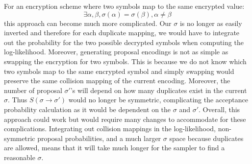 \documentclass[12pt]{article}
\begin{document}
\begin{enumerate}
For an encryption scheme where two symbols map to the same encrypted value:
$$\exists \alpha, \beta, \sigma(\alpha) = \sigma(\beta), \alpha \neq \beta$$
this approach can become much more complicated. Our $\sigma$ is no longer as easily inverted and therefore for each duplicate mapping, we would have to integrate out the probability for the two possible decrypted symbols when computing the log-likelihood. Moreover, generating proposal encodings is not as simple as swapping the encryption for two symbols. This is because we do not know which two symbols map to the same encrypted symbol and simply swapping would preserve the same collision mapping of the current encoding. Moreover, the number of proposal $\sigma'$'s will depend on how many duplicates exist in the current $\sigma$. Thus $S(\sigma \rightarrow \sigma')$ would no longer be symmetric, complicating the acceptance probability calculation as it would be dependent on the $\sigma$ and $\sigma'$. Overall, this approach could work but would require many changes to accommodate for these complications. Integrating out collision mappings in the log-likelihood, non-symmetric proposal probabilities, and a much larger $\sigma$ space because duplicates are allowed, means that it will take much longer for the sampler to find a reasonable $\sigma$.



\end{enumerate}
\end{document}
